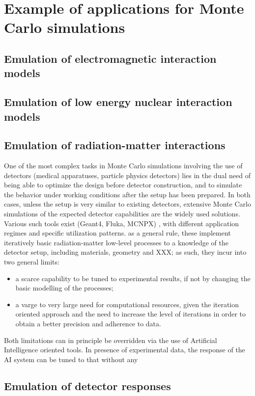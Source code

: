 \section{Example of applications for Monte Carlo simulations}
\subsection{Emulation of electromagnetic interaction models}
\subsection{Emulation of low energy nuclear interaction models}
\subsection{Emulation of radiation-matter interactions}
One of the most complex tasks in Monte Carlo simulations involving the use of detectors (medical apparatuses, particle physics detectors) lies in the dual need of being able to optimize the design before detector construction, and to simulate the behavior under working conditions after the setup has been prepared.
In both cases, unless the setup is very similar to existing detectors, extensive Monte Carlo simulations of the expected detector capabilities are the widely used solutions. Various such tools exist (Geant4\cite{g4}, Fluka\cite{fluka}, MCNPX\cite{MCNPX})
, with different application regimes and specific utilization patterns. as a general rule, these implement iteratively basic radiation-matter low-level processes to a knowledge of the detector setup, including materials, geometry and  XXX; as such, they incur into two general limits:
\begin{itemize}
\item a scarce capability to be tuned to experimental results, if not by changing the basic modelling of the processes;
\item a varge to very large need for computational resources, given the iteration oriented approach and the need to increase the level of iterations in order to obtain a better precision and adherence to data.
\end{itemize}

Both limitations can in principle be overridden via the use of Artificial Intelligence oriented tools.
In presence of experimental data, the response of the AI system can be tuned to that without any 


\subsection{Emulation of detector responses}
